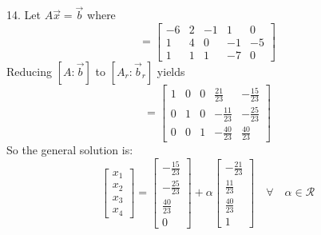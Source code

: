 \documentclass[11pt]{homework}
\begin{document}
14. Let $ A \vec x = \vec b$ where
\begin{equation*}
  [A: \vec b] = 
  \left[
  \begin{array}{cccc|c}
  -6 & 2 & -1 & 1 & 0  \\
   1 & 4 & 0 & -1 & -5  \\
  1 & 1 & 1 & -7  & 0
  \end{array}
  \right]
\end{equation*}
Reducing $[A: \vec b]$ to $[A_r: \vec b_r]$ yields
\begin{equation*}
  [A_r: \vec b_r] = 
  \left[
  \begin{array}{cccc|c}
  1 & 0 & 0 & \frac{21}{23}  & -\frac{15}{23} \\
  0 & 1 & 0 & -\frac{11}{23} & -\frac{25}{23} \\
  0 & 0 & 1 & -\frac{40}{23} & \frac{40}{23} 
  \end{array}
  \right]
\end{equation*}
So the general solution is:
\begin{equation*}
  \begin{bmatrix}
  x_1 \\
  x_2 \\
  x_3 \\
  x_4
  \end{bmatrix}
  =
  \begin{bmatrix}
  -\frac{15}{23} \\
  -\frac{25}{23} \\
  \frac{40}{23}  \\
  0
  \end{bmatrix}
  + \alpha
  \begin{bmatrix}
  -\frac{21}{23}  \\
  \frac{11}{23} \\
  \frac{40}{23} \\
  1
  \end{bmatrix}
  \quad \forall \quad \alpha \in \mathcal{R}
\end{equation*}
\end{document}
